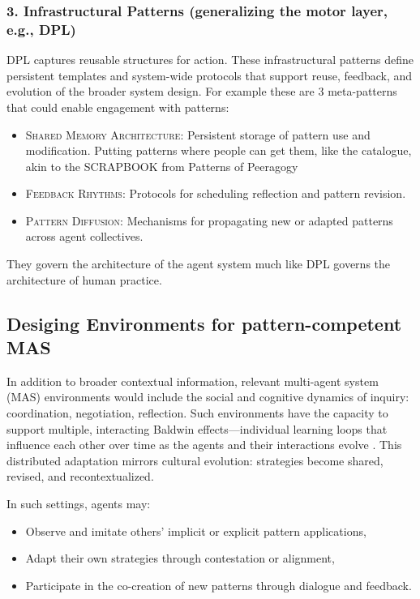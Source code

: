 \documentclass[acmlarge,timestamp]{acmart}
\providecommand{\tightlist}{%
  \setlength{\itemsep}{0pt}\setlength{\parskip}{0pt}}
\begin{document}
\subsubsection*{3. Infrastructural Patterns (generalizing the motor layer, e.g., DPL)}

DPL captures reusable structures for action. These infrastructural
patterns define persistent templates and system-wide protocols that
support reuse, feedback, and evolution of the broader system
design. For example these are 3 meta-patterns that could enable
engagement with patterns:

\begin{itemize}
\tightlist
\item[]
  {\scshape{Shared Memory Architecture}}{: Persistent storage of pattern use and
  modification. Putting patterns where people can get them, like the
  catalogue, akin to the SCRAPBOOK from Patterns of Peeragogy \cite{10.5555/3124497.3124531}}
\item[]
  {\scshape{Feedback Rhythms}}{: Protocols for scheduling reflection
    and pattern revision.}
\item[]
  {\scshape {Pattern Diffusion}}{: Mechanisms for propagating new or
    adapted patterns across agent collectives.}
\end{itemize}

They govern the architecture of the agent system much like DPL governs
the architecture of human practice.

\subsection{Desiging Environments for pattern-competent MAS}

In addition to broader contextual information, relevant multi-agent
system (MAS) environments would include the social and cognitive
dynamics of inquiry: coordination, negotiation, reflection.  Such
environments have the capacity to support multiple, interacting
Baldwin effects---individual learning loops that influence each other
over time as the agents and their interactions evolve \cite{Redko}.
This distributed adaptation mirrors cultural evolution: strategies
become shared, revised, and recontextualized.

{In such settings, agents may:}

\begin{itemize}
\tightlist
\item {Observe and imitate others’ implicit or explicit pattern applications,}
\item {Adapt their own strategies through contestation or alignment,}
\item {Participate in the co-creation of new patterns through dialogue and feedback.}
\end{itemize}
\end{document}
